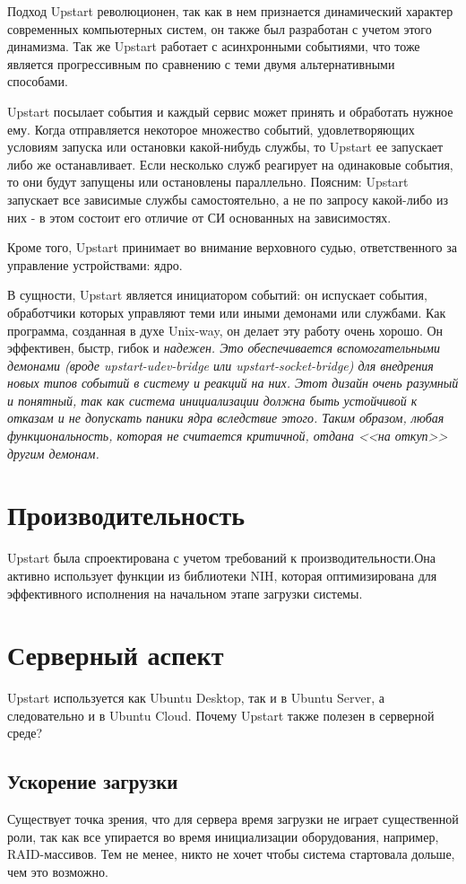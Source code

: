 Подход Upstart революционен, так как в нем признается динамический характер современных компьютерных систем, он также был разработан с учетом этого динамизма. Так же Upstart работает с асинхронными событиями, что тоже является прогрессивным по сравнению с теми двумя альтернативными способами.

Upstart посылает события и каждый сервис может принять и обработать нужное ему. Когда отправляется некоторое множество событий, удовлетворяющих условиям запуска или остановки какой-нибудь службы, то Upstart ее запускает либо же останавливает. Если несколько служб реагирует на одинаковые события, то они будут запущены или остановлены параллельно. Поясним: Upstart запускает все зависимые службы самостоятельно, а не по запросу какой-либо из них - в этом состоит его отличие от СИ основанных на зависимостях.

Кроме того, Upstart принимает во внимание верховного судью, ответственного за управление устройствами: ядро.

В сущности, Upstart является инициатором событий: он испускает события, обработчики которых управляют теми или иными демонами или службами. Как программа, созданная в духе Unix-way, он делает эту работу очень хорошо. Он эффективен, быстр, гибок и \it{надежен}. Это обеспечивается вспомогательными демонами (вроде upstart-udev-bridge или upstart-socket-bridge) для внедрения новых типов событий в систему и реакций на них. Этот дизайн очень разумный и понятный, так как система инициализации должна быть устойчивой к отказам и не допускать паники ядра вследствие этого. Таким образом, любая функциональность, которая не считается критичной, отдана <<на откуп>> другим демонам.
\section{Производительность}
Upstart была спроектирована с учетом требований к производительности.Она активно использует функции из библиотеки NIH, которая оптимизирована для эффективного исполнения на начальном этапе загрузки системы. 
\section{Серверный аспект} 
Upstart используется как Ubuntu Desktop, так и в Ubuntu Server, а следовательно и в Ubuntu Cloud. Почему Upstart также полезен в серверной среде?
\subsection{Ускорение загрузки}
Существует точка зрения, что для сервера время загрузки не играет существенной роли, так как все упирается во время инициализации оборудования, например, RAID-массивов. Тем не менее, никто не хочет чтобы система стартовала дольше, чем это возможно.

